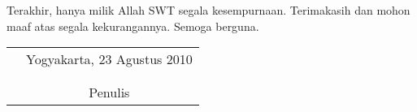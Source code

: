 \documentclass[skripsi]{unhasskripsi}
\theoremstyle{definition}
\begin{document}
Terakhir, hanya milik Allah SWT segala kesempurnaan. Terimakasih dan mohon maaf atas segala kekurangannya. Semoga berguna.

\vspace{0.8cm}

\begin{tabular}{p{7.5cm}c}
&Yogyakarta, 23 Agustus 2010\\
&\\
&\\
&Penulis
\end{tabular}

\makeatletter
\renewcommand\l@chapter[2]{%
  \ifnum \c@tocdepth >\z@
    \addpenalty\@secpenalty
    \addvspace{0.75em \@plus\p@}%
    \setlength\@tempdima{1.5em}%
    \begingroup
      \parindent \z@ \rightskip \@pnumwidth
      \parfillskip -\@pnumwidth
      \leavevmode \bfseries
      \advance\leftskip\@tempdima
      \hskip -\leftskip
      #1\nobreak\
      \leaders\hbox{$\m@th\mkern \@dotsep mu\hbox{.}\mkern \@dotsep mu$}
     \hfil \nobreak\hb@xt@\@pnumwidth{\hss #2}\par
    \endgroup
  \fi}
\makeatother

\tableofcontents
{}


\listoftables
{}

\listoffigures
{}
\end{document}
